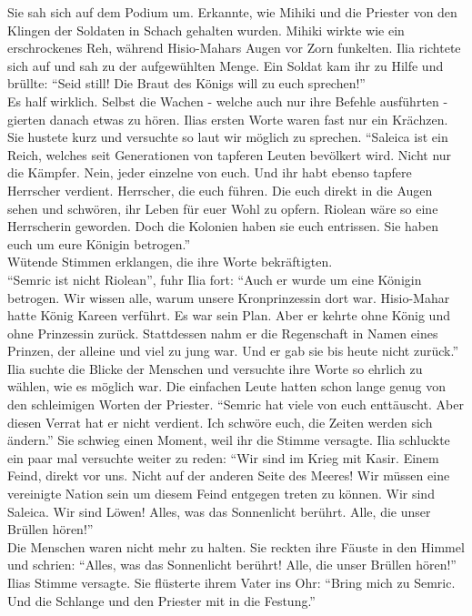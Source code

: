 Sie sah sich auf dem Podium um. Erkannte, wie Mihiki und die Priester von den Klingen der Soldaten 
in Schach gehalten wurden. Mihiki wirkte wie ein erschrockenes Reh, während Hisio-Mahars Augen vor 
Zorn funkelten. Ilia richtete sich auf und sah zu der aufgewühlten Menge. Ein Soldat kam ihr zu 
Hilfe und brüllte: ``Seid still! Die Braut des Königs will zu euch sprechen!''\\
Es half wirklich. Selbst die Wachen - welche auch nur ihre Befehle ausführten - gierten danach 
etwas zu hören. Ilias ersten Worte waren fast nur ein Krächzen. Sie hustete kurz und versuchte so 
laut wir möglich zu sprechen. ``Saleica ist ein Reich, welches seit Generationen von tapferen 
Leuten bevölkert wird. Nicht nur die Kämpfer. Nein, jeder einzelne von euch. Und ihr habt ebenso 
tapfere Herrscher verdient. Herrscher, die euch führen. Die euch direkt in die Augen sehen und 
schwören, ihr Leben für euer Wohl zu opfern. Riolean wäre so eine Herrscherin geworden. Doch die 
Kolonien haben sie euch entrissen. Sie haben euch um eure Königin betrogen.''\\
Wütende Stimmen erklangen, die ihre Worte bekräftigten.\\
``Semric ist nicht Riolean'', fuhr Ilia fort: ``Auch er wurde um eine Königin betrogen. Wir wissen 
alle, warum unsere Kronprinzessin dort war. Hisio-Mahar hatte König Kareen verführt. Es war sein 
Plan. Aber er kehrte ohne König und ohne Prinzessin zurück. Stattdessen nahm er die Regenschaft in 
Namen eines Prinzen, der alleine und viel zu jung war. Und er gab sie bis heute nicht zurück.''\\
Ilia suchte die Blicke der Menschen und versuchte ihre Worte so ehrlich zu wählen, wie es möglich 
war. Die einfachen Leute hatten schon lange genug von den schleimigen Worten der Priester. ``Semric 
hat viele von euch enttäuscht. Aber diesen Verrat hat er nicht verdient. Ich schwöre euch, die 
Zeiten werden sich ändern.'' Sie schwieg einen Moment, weil ihr die Stimme versagte. Ilia 
schluckte ein paar mal versuchte weiter zu reden: ``Wir sind im Krieg mit Kasir. Einem Feind, 
direkt vor uns. Nicht auf der anderen Seite des Meeres! Wir müssen eine vereinigte Nation sein um 
diesem Feind entgegen treten zu können. Wir sind Saleica. Wir sind Löwen! Alles, was das 
Sonnenlicht berührt. Alle, die unser Brüllen hören!''\\
Die Menschen waren nicht mehr zu halten. Sie reckten ihre Fäuste in den Himmel und schrien: 
``Alles, was das Sonnenlicht berührt! Alle, die unser Brüllen hören!''\\
Ilias Stimme versagte. Sie flüsterte ihrem Vater ins Ohr: ``Bring mich zu Semric. Und die Schlange 
und den Priester mit in die Festung.''\\


